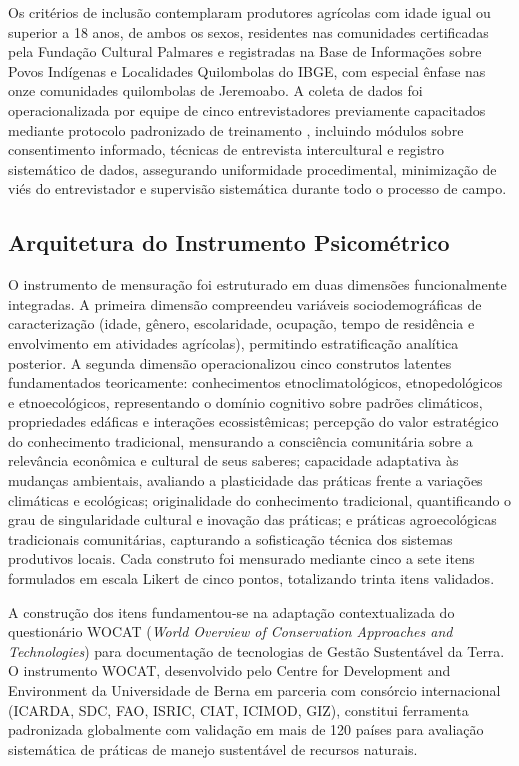 Os critérios de inclusão contemplaram produtores agrícolas com idade igual ou superior a 18 anos, de ambos os sexos, residentes nas comunidades certificadas pela Fundação Cultural Palmares e registradas na Base de Informações sobre Povos Indígenas e Localidades Quilombolas do IBGE, com especial ênfase nas onze comunidades quilombolas de Jeremoabo. A coleta de dados foi operacionalizada por equipe de cinco entrevistadores previamente capacitados mediante protocolo padronizado de treinamento \cite{Fowler2014}, incluindo módulos sobre consentimento informado, técnicas de entrevista intercultural e registro sistemático de dados, assegurando uniformidade procedimental, minimização de viés do entrevistador e supervisão sistemática durante todo o processo de campo.

\subsection{Arquitetura do Instrumento Psicométrico}

O instrumento de mensuração foi estruturado em duas dimensões funcionalmente integradas. A primeira dimensão compreendeu variáveis sociodemográficas de caracterização (idade, gênero, escolaridade, ocupação, tempo de residência e envolvimento em atividades agrícolas), permitindo estratificação analítica posterior. A segunda dimensão operacionalizou cinco construtos latentes fundamentados teoricamente: conhecimentos etnoclimatológicos, etnopedológicos e etnoecológicos, representando o domínio cognitivo sobre padrões climáticos, propriedades edáficas e interações ecossistêmicas; percepção do valor estratégico do conhecimento tradicional, mensurando a consciência comunitária sobre a relevância econômica e cultural de seus saberes; capacidade adaptativa às mudanças ambientais, avaliando a plasticidade das práticas frente a variações climáticas e ecológicas; originalidade do conhecimento tradicional, quantificando o grau de singularidade cultural e inovação das práticas; e práticas agroecológicas tradicionais comunitárias, capturando a sofisticação técnica dos sistemas produtivos locais. Cada construto foi mensurado mediante cinco a sete itens formulados em escala Likert de cinco pontos, totalizando trinta itens validados. 

A construção dos itens fundamentou-se na adaptação contextualizada do questionário WOCAT (\textit{World Overview of Conservation Approaches and Technologies}) \cite{Liniger2019} para documentação de tecnologias de Gestão Sustentável da Terra. O instrumento WOCAT, desenvolvido pelo Centre for Development and Environment da Universidade de Berna em parceria com consórcio internacional (ICARDA, SDC, FAO, ISRIC, CIAT, ICIMOD, GIZ), constitui ferramenta padronizada globalmente com validação em mais de 120 países \cite{Schwilch2011} para avaliação sistemática de práticas de manejo sustentável de recursos naturais. 


